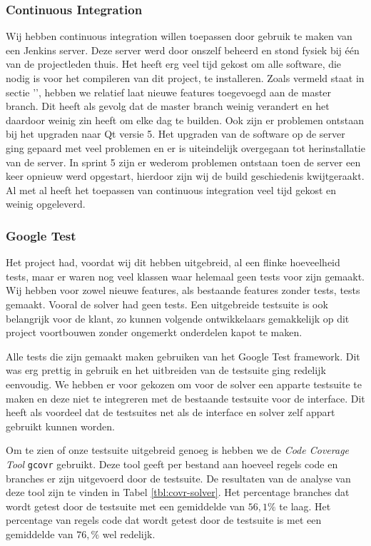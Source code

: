 \subsubsection{Continuous Integration}
Wij hebben continuous integration willen toepassen door gebruik te maken van een Jenkins server. Deze server werd door onszelf beheerd en stond fysiek bij \'e\'en van de projectleden thuis. Het heeft erg veel tijd gekost om alle software, die nodig is voor het compileren van dit project, te installeren. Zoals vermeld staat in sectie '', hebben we relatief laat nieuwe features toegevoegd aan de master branch. Dit heeft als gevolg dat de master branch weinig verandert en het daardoor weinig zin heeft om elke dag te builden. Ook zijn er problemen ontstaan bij het upgraden naar Qt versie 5. Het upgraden van de software op de server ging gepaard met veel problemen en er is uiteindelijk overgegaan tot herinstallatie van de server. In sprint 5 zijn er wederom problemen ontstaan toen de server een keer opnieuw werd opgestart, hierdoor zijn wij de build geschiedenis kwijtgeraakt. Al met al heeft het toepassen van continuous integration veel tijd gekost en weinig opgeleverd. 

\subsubsection{Google Test}
Het project had, voordat wij dit hebben uitgebreid, al een flinke hoeveelheid tests, maar er waren nog veel klassen waar helemaal geen tests voor zijn gemaakt. Wij hebben voor zowel nieuwe features, als bestaande features zonder tests, tests gemaakt. Vooral de solver had geen tests. Een uitgebreide testsuite is ook belangrijk voor de klant, zo kunnen volgende ontwikkelaars gemakkelijk op dit project voortbouwen zonder ongemerkt onderdelen kapot te maken. 

Alle tests die zijn gemaakt maken gebruiken van het Google Test framework. Dit was erg prettig in gebruik en het uitbreiden van de testsuite ging redelijk eenvoudig. We hebben er voor gekozen om voor de solver een apparte testsuite te maken en deze niet te integreren met de bestaande testsuite voor de interface. Dit heeft als voordeel dat de testsuites net als de interface en solver zelf appart gebruikt kunnen worden. 

Om te zien of onze testsuite uitgebreid genoeg is hebben we de \emph{Code Coverage Tool} \texttt{gcovr} gebruikt. Deze tool geeft per bestand aan hoeveel regels code en branches er zijn uitgevoerd door de testsuite. De resultaten van de analyse van deze tool zijn te vinden in Tabel \ref{tbl:covr-solver}. Het percentage branches dat wordt getest door de testsuite met een gemiddelde van $56,1\%$ te laag. Het percentage van regels code dat wordt getest door de testsuite is met een gemiddelde van $76,\%$ wel redelijk.

